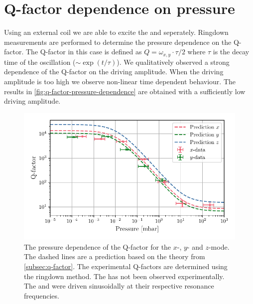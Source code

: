 \section{Q-factor dependence on pressure}
\label{sec:q-factor-dependence-on-pressure}
Using an external coil we are able to excite the \xmode  and \ymode seperately. Ringdown measurements are performed to determine the pressure dependence on the Q-factor. The Q-factor in this case is defined as $Q = \omega_{x,y} \cdot \tau / 2$ where $\tau$ is the decay time of the oscillation ($\sim \exp\left(t / \tau\right)$). We qualitatively observed a strong dependence of the Q-factor on the driving amplitude. When the driving amplitude is too high we observe non-linear time dependent behaviour. The results in \autoref{fig:q-factor-pressure-dependence} are obtained with a sufficiently low driving amplitude.

\begin{figure}
    \centering
    \includegraphics{figures/data/q_factor_pressure_dependence.pdf}
    \caption{The pressure dependence of the Q-factor for the $x$-, $y$- and $z$-mode. The dashed lines are a prediction based on the theory from \autoref{subsec:q-factor}. The experimental Q-factors are determined using the ringdown method. The \zmode has not been observed experimentally. The \xmode and \ymode were driven sinusoidally at their respective resonance frequencies.}
    \label{fig:q-factor-pressure-dependence}
\end{figure}
